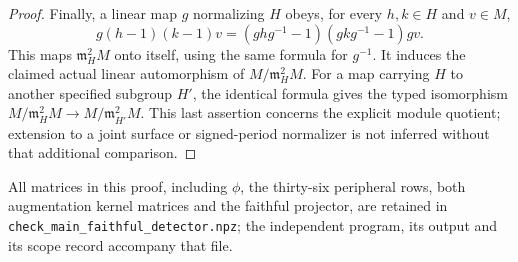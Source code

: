 \begin{proof}
Finally, a linear map \(g\) normalizing \(H\)
obeys, for every \(h,k\in H\) and \(v\in M\),
\[
 g(h-1)(k-1)v
  =(ghg^{-1}-1)(gkg^{-1}-1)gv.
 \tag{FK.6}
\]
This maps \(\mathfrak m_H^2M\) onto itself,
using the same formula for \(g^{-1}\).
It induces the claimed actual linear
automorphism of \(M/\mathfrak m_H^2M\).
For a map carrying \(H\) to another specified
subgroup \(H'\), the identical formula gives
the typed isomorphism
\(M/\mathfrak m_H^2M\to
M/\mathfrak m_{H'}^2M\).
This last assertion concerns the explicit
module quotient; extension to a joint surface
or signed-period normalizer is not inferred
without that additional comparison.
\end{proof}

All matrices in this proof, including \(\phi\),
the thirty-six peripheral rows, both augmentation
kernel matrices and the faithful projector, are
retained in
\texttt{check\_main\_faithful\_detector.npz};
the independent program, its output and its
scope record accompany that file.

